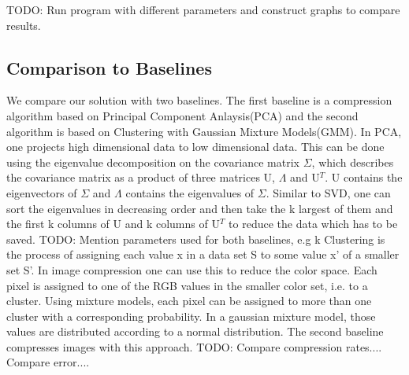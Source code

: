 \newline
TODO: Run program with different parameters and construct graphs to compare results.

\subsection{Comparison to Baselines}
We compare our solution with two baselines. The first baseline is a compression algorithm based on Principal Component Anlaysis(PCA) and the second algorithm is based on Clustering with Gaussian Mixture Models(GMM).  
\newline
In PCA, one projects high dimensional data to low dimensional data. This can be done using the eigenvalue decomposition on the covariance matrix $\Sigma$, which describes the covariance matrix as a product of three matrices U, $\Lambda$ and U$^T$. U contains the eigenvectors of  $\Sigma$ and $\Lambda$ contains the eigenvalues of $\Sigma$. Similar to SVD, one can sort the eigenvalues in decreasing order and then take the k largest of them and the first k columns of U and k columns of U$^T$ to reduce the data which has to be saved. 
\newline
\newline
TODO: Mention parameters used for both baselines, e.g k
\newline
\newline
Clustering is the process of assigning each value x in a data set S to some value x' of a smaller set S'. In image compression one can use this to reduce the color space. Each pixel is assigned to one of the RGB values in the smaller color set, i.e. to a cluster. Using mixture models, each pixel can be assigned to more than one cluster with a corresponding probability. In a gaussian mixture model, those values are distributed according to a normal distribution. The second baseline compresses images with this approach. 
\newline
TODO:
\newline
Compare compression rates.... 
\newline
Compare error....
